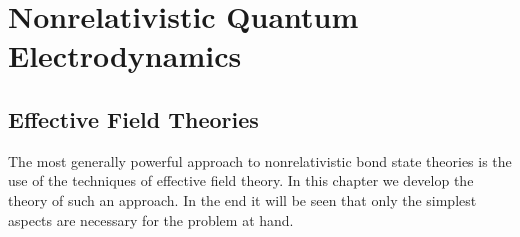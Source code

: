 \chapter{Nonrelativistic Quantum Electrodynamics}

\section{Effective Field Theories}
The most generally powerful approach to nonrelativistic bond state theories is the use of the techniques of effective field theory.  In this chapter we develop the theory of such an approach.  In the end it will be seen that only the simplest aspects are necessary for the problem at hand.







